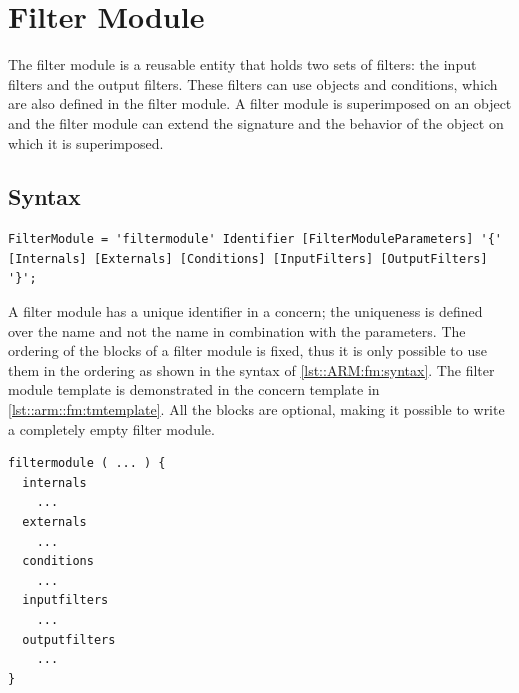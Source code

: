 \chapter{Filter Module} \label{chapter:filtermodule}
The filter module is a reusable entity that holds two sets of filters: the input filters and the output filters. 
These filters can use objects and conditions, which are also defined in the filter module. 
A filter module is superimposed on an object and the filter module can extend the signature and the behavior of the object on which it is superimposed.

\section{Syntax}
\begin{lstlisting}[caption = {Filter module syntax}, label = lst::ARM:fm:syntax, style = listing, language = ebnf, float = tpb]
FilterModule = 'filtermodule' Identifier [FilterModuleParameters] '{' [Internals] [Externals] [Conditions] [InputFilters] [OutputFilters] '}';
\end{lstlisting}
A filter module has a unique identifier in a concern; the uniqueness is defined over the name and not the name in combination with the parameters.
The  ordering of the blocks of a filter module is fixed, thus it is only possible to use them in the ordering as shown in the syntax of \autoref{lst::ARM:fm:syntax}. 
The filter module template is demonstrated in the concern template in \autoref{lst::arm::fm:tmtemplate}.
All the blocks are optional, making it possible to write a completely empty filter module.
\begin{lstlisting}[language={Composestar},style=floatlisting, caption={Filter module template},label={lst::arm::fm:tmtemplate}, floatplacement=tbp]
filtermodule ( ... ) {
  internals
    ...
  externals
    ...
  conditions
    ...
  inputfilters
    ...
  outputfilters
    ...
}
\end{lstlisting}

